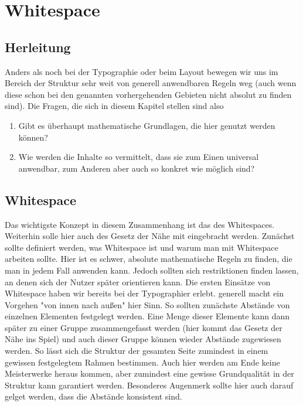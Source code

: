 
\newcommand{\chaptertitle}{Whitespace}

\chapter{\chaptertitle} %

\label{Whitespace} %

\lhead{\chaptername{} \thechapter{} - \emph{\chaptertitle}} %


\section{Herleitung}

Anders als noch bei der Typographie oder beim Layout bewegen wir uns im Bereich der Struktur sehr weit von generell anwendbaren Regeln weg (auch wenn diese schon bei den genannten vorhergehenden Gebieten nicht absolut zu finden sind). Die Fragen, die sich in diesem Kapitel stellen sind also
\begin{enumerate}
 \item Gibt es überhaupt mathematische Grundlagen, die hier genutzt werden können?
 \item Wie werden die Inhalte so vermittelt, dass sie zum Einen universal anwendbar, zum Anderen aber auch so konkret wie möglich sind?
\end{enumerate}


\section{Whitespace}

Das wichtigste Konzept in diesem Zusammenhang ist das des Whitespaces. Weiterhin solle hier auch des Gesetz der Nähe mit eingebracht werden. Zunächst sollte definiert werden, was Whitespace ist und warum man mit Whitespace arbeiten sollte.
Hier ist es schwer, absolute mathematische Regeln zu finden, die man in jedem Fall anwenden kann. Jedoch sollten sich restriktionen finden lassen, an denen sich der Nutzer später orientieren kann.
Die ersten Einsätze von Whitespace haben wir bereits bei der Typographier erlebt. generell macht ein Vorgehen "von innen nach außen" hier Sinn. So sollten zunächste Abstände von einzelnen Elementen festgelegt werden. Eine Menge dieser Elemente kann dann später zu einer Gruppe zusammengefasst werden (hier kommt das Gesetz der Nähe ins Spiel) und auch dieser Gruppe können wieder Abstände zugewiesen werden. So lässt sich die Struktur der gesamten Seite zumindest in einem gewissen festgelegtem Rahmen bestimmen.
Auch hier werden am Ende keine Meisterwerke heraus kommen, aber zumindest eine gewisse Grundqualität in der Struktur kann garantiert werden. Besonderes Augenmerk sollte hier auch darauf gelget werden, dass die Abstände konsistent sind.

